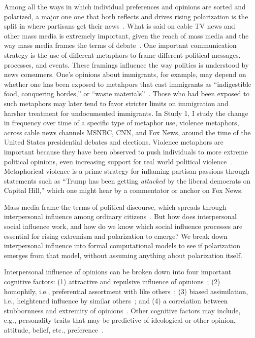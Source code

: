 Among all the ways in which individual preferences and opinions are sorted and polarized, a
major one one that both reflects and drives rising polarization is the split in
where partisans get their news~\cite{Pew2014PolarizationAndMediaHabits,Martin2017}. 
What is said on cable TV news and other mass media is extremely important, given
the reach of mass media and the way mass media frames the terms of debate~\cite{Chong2007}.
One important communication strategy is the use of different 
metaphors to frame different political
messages, processes, and events. These framings influence the way politics is understood by 
news consumers. One's opinions about immigrants, for example, may depend
on whether one has been exposed to metahpors that cast immigrants as 
``indigestible food, conquering hordes,'' or ``waste materials''~\cite{OBrien2003}.
Those who had been exposed to such metaphors may later tend to favor stricter limits
on immigration and harsher treatment for undocumented immigrants.
In Study 1, I study the change in frequency over time of a 
specific type of metaphor use, violence metaphors, across cable news channels
MSNBC, CNN, and Fox News, around the time of the United States presidential
debates and elections. Violence metaphors are important because they have
been observed to push individuals to more extreme political opinions, even
increasing support for real world political violence~\cite{Kalmoe2014,Kalmoe2018}.
Metaphorical violence is a prime strategy for inflaming partisan passions 
through statements such as ``Trump has been getting \emph{attacked} by the liberal
democrats on Capital Hill,'' which one might hear by a commentator or anchor on Fox News.

Mass media frame the terms of political discourse, which spreads through
interpersonal influence among ordinary citizens~\cite{Katz1955}. But how does 
interpersonal social influence work, and how do we know which social 
influence processes are essential for rising extremism and polarization to
emerge? We break down interpersonal influence into formal computational
models to see if polarization emerges from that model, without assuming anything
about polarization itself. 

Interpersonal influence of opinions can be broken down into
four important cognitive factors: (1) attractive and repulsive influence of
opinions~\cite{French1956,Cikara2014,Bail2018}; (2) homophily, i.e., preferential assortment with like others~\cite{McPherson2001};
(3) biased assimilation, i.e., heightened influence by similar others~\cite{Dandekar2013}; and
(4) a correlation between stubbornness and extremity of opinions~\cite{Reiss2019,Zmigrod2019a}. 
Other cognitive factors may include, e.g., personality traits that may be predictive of 
ideological or other opinion, attitude, belief, etc., preference~\cite{Zmigrod2018}.

